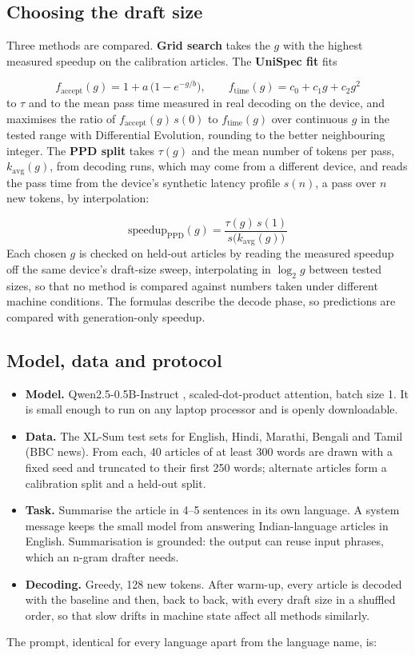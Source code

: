 \documentclass[11pt,a4paper]{article}
\begin{document}
\subsection{Choosing the draft size}
Three methods are compared. \textbf{Grid search} takes the $g$ with the highest measured speedup on the calibration articles. The \textbf{UniSpec fit} fits

\begin{equation}
f_{\mathrm{accept}}(g)=1+a\,\bigl(1-e^{-g/b}\bigr),\qquad f_{\mathrm{time}}(g)=c_0+c_1g+c_2g^2
\end{equation}
to $\tau$ and to the mean pass time measured in real decoding on the device, and maximises the ratio of $f_{\mathrm{accept}}(g)\,s(0)$ to $f_{\mathrm{time}}(g)$ over continuous $g$ in the tested range with Differential Evolution, rounding to the better neighbouring integer. The \textbf{PPD split} takes $\tau(g)$ and the mean number of tokens per pass, $k_{\mathrm{avg}}(g)$, from decoding runs, which may come from a different device, and reads the pass time from the device's synthetic latency profile $s(n)$, a pass over $n$ new tokens, by interpolation:

\begin{equation}
\mathrm{speedup}_{\mathrm{PPD}}(g)=\frac{\tau(g)\,s(1)}{s\bigl(k_{\mathrm{avg}}(g)\bigr)}
\end{equation}
Each chosen $g$ is checked on held-out articles by reading the measured speedup off the same device's draft-size sweep, interpolating in $\log_2 g$ between tested sizes, so that no method is compared against numbers taken under different machine conditions. The formulas describe the decode phase, so predictions are compared with generation-only speedup.

\subsection{Model, data and protocol}
\begin{itemize}
  \item \textbf{Model.} Qwen2.5-0.5B-Instruct \cite{qwen}, scaled-dot-product attention, batch size 1. It is small enough to run on any laptop processor and is openly downloadable.
  \item \textbf{Data.} The XL-Sum \cite{xlsum} test sets for English, Hindi, Marathi, Bengali and Tamil (BBC news). From each, 40 articles of at least 300 words are drawn with a fixed seed and truncated to their first 250 words; alternate articles form a calibration split and a held-out split.
  \item \textbf{Task.} Summarise the article in 4--5 sentences in its own language. A system message keeps the small model from answering Indian-language articles in English. Summarisation is grounded: the output can reuse input phrases, which an n-gram drafter needs.
  \item \textbf{Decoding.} Greedy, 128 new tokens. After warm-up, every article is decoded with the baseline and then, back to back, with every draft size in a shuffled order, so that slow drifts in machine state affect all methods similarly.
\end{itemize}
The prompt, identical for every language apart from the language name, is:
\end{document}
